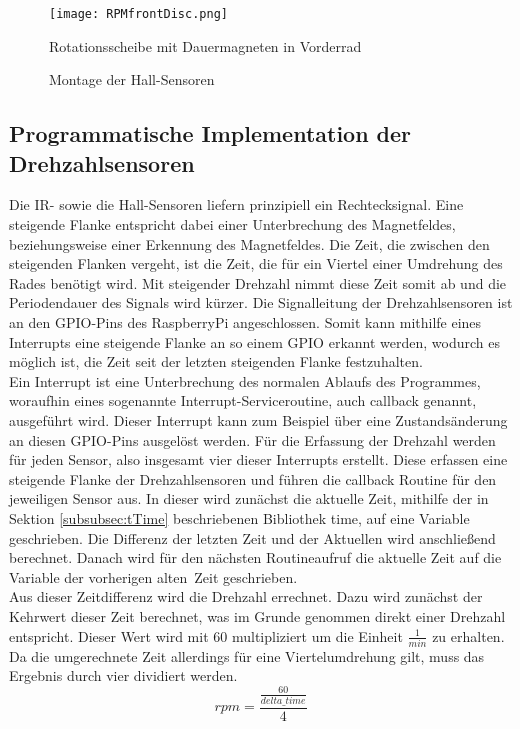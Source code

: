 \begin{figure}[h]
\centering
\texttt{[image: RPMfrontDisc.png]}
\caption{Rotationsscheibe mit Dauermagneten in Vorderrad}
\label{fig:RPMfrontDisc}
\end{figure}

\begin{figure}[h]
\centering
\missingfigure{}
\caption{Montage der Hall-Sensoren}
\label{fig:RPMfrontMount}
\end{figure}

\newpage
\subsection{Programmatische Implementation der Drehzahlsensoren}
\label{subsec:RPMprogram}
Die \ac{IR}- sowie die Hall-Sensoren liefern prinzipiell ein Rechtecksignal. Eine steigende Flanke entspricht dabei einer Unterbrechung des Magnetfeldes, beziehungsweise einer Erkennung des Magnetfeldes. Die Zeit, die zwischen den steigenden Flanken vergeht, ist  die Zeit, die für ein Viertel einer Umdrehung des Rades benötigt wird. Mit steigender Drehzahl nimmt diese Zeit somit ab und die Periodendauer des Signals wird kürzer. Die Signalleitung der Drehzahlsensoren ist an den \ac{GPIO}-Pins des RaspberryPi angeschlossen. Somit kann mithilfe eines Interrupts eine steigende Flanke an so einem \ac{GPIO} erkannt werden, wodurch es möglich ist, die Zeit seit der letzten steigenden Flanke festzuhalten.\\
Ein Interrupt ist eine Unterbrechung des normalen Ablaufs des Programmes, woraufhin eines sogenannte Interrupt-Serviceroutine, auch callback genannt, ausgeführt wird. Dieser Interrupt kann zum Beispiel über eine Zustandsänderung an diesen \ac{GPIO}-Pins ausgelöst werden. Für die Erfassung der Drehzahl werden für jeden Sensor, also insgesamt vier dieser Interrupts erstellt. Diese erfassen eine steigende Flanke der Drehzahlsensoren und führen die callback Routine für den jeweiligen Sensor aus. In dieser wird zunächst die aktuelle Zeit, mithilfe der in Sektion \ref{subsubsec:tTime} beschriebenen Bibliothek time, auf eine Variable geschrieben. Die Differenz der letzten Zeit und der Aktuellen wird anschließend berechnet. Danach wird für den nächsten Routineaufruf die aktuelle Zeit auf die Variable der vorherigen \glqq alten\grqq\ Zeit geschrieben.\\
Aus dieser Zeitdifferenz wird die Drehzahl errechnet. Dazu wird zunächst der Kehrwert dieser Zeit berechnet, was im Grunde genommen direkt einer Drehzahl entspricht. Dieser Wert wird mit 60 multipliziert um die Einheit $\frac{1}{min}$ zu erhalten. Da die umgerechnete Zeit allerdings für eine Viertelumdrehung gilt, muss das Ergebnis durch vier dividiert werden.
\begin{equation}
rpm=\frac{\frac{60}{delta\_time}}{4}
\label{eqn:rpm}
\end{equation}

